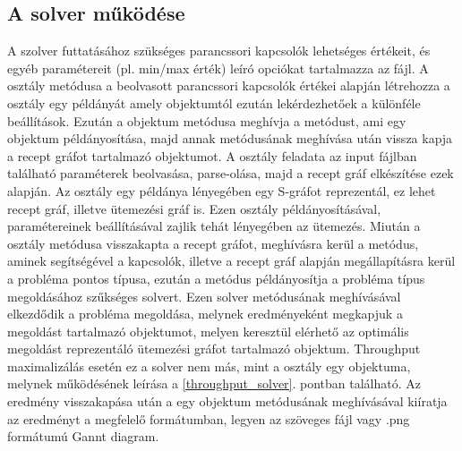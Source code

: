 \subsection{A solver működése}
A szolver futtatásához szükséges parancssori kapcsolók lehetséges értékeit, és egyéb paramétereit (pl. min/max érték) leíró opciókat tartalmazza az  fájl. 
A  osztály  metódusa a beolvasott parancssori kapcsolók értékei alapján létrehozza a  osztály egy példányát amely objektumtól ezután lekérdezhetőek a különféle beállítások.
Ezután a  objektum  metódusa meghívja a  metódust, ami egy  objektum példányosítása, majd annak  metódusának meghívása után vissza kapja a recept gráfot tartalmazó  objektumot.
A  osztály feladata az input fájlban található paraméterek beolvasása, parse-olása, majd a recept gráf elkészítése ezek alapján.
Az  osztály egy példánya lényegében egy S-gráfot reprezentál, ez lehet recept gráf, illetve ütemezési gráf is.
Ezen osztály példányosításával, paramétereinek beállításával zajlik tehát lényegében az ütemezés.
Miután a  osztály  metódusa visszakapta a recept gráfot, meghívásra kerül a  metódus, aminek segítségével a kapcsolók, illetve a recept gráf alapján megállapításra kerül a probléma pontos típusa, ezután a  metódus példányosítja a probléma típus megoldásához szűkséges solvert.
Ezen solver  metódusának meghívásával elkezdődik a probléma megoldása, melynek eredményeként megkapjuk a megoldást tartalmazó  objektumot, melyen keresztül elérhető az optimális megoldást reprezentáló ütemezési gráfot tartalmazó  objektum.
Throughput maximalizálás esetén ez a solver nem más, mint a  osztály egy objektuma, melynek működésének leírása a \ref{throughput_solver}. pontban található.  
Az eredmény visszakapása után a  egy  objektum  metódusának meghívásával kiíratja az eredményt a megfelelő formátumban, legyen az szöveges fájl vagy .png formátumú Gannt diagram.
